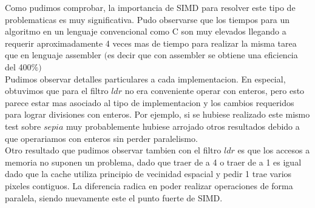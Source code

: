 Como pudimos comprobar, la importancia de SIMD para resolver este tipo de problematicas es muy significativa. 
Pudo observarse que los tiempos para un algoritmo en un lenguaje convencional como C son muy elevados llegando a requerir aproximadamente 4 veces mas de tiempo para realizar la misma tarea que en lenguaje assembler $($es decir que con assembler se obtiene una eficiencia del 400$ \% )$\\

Pudimos observar detalles particulares a cada implementacion. En especial, obtuvimos que para el filtro $ldr$ no era conveniente operar con enteros, pero esto parece estar mas asociado al tipo de implementacion y los cambios requeridos para lograr divisiones con enteros. Por ejemplo, si se hubiese realizado este mismo test sobre $sepia$ muy probablemente hubiese arrojado otros resultados debido a que operariamos con enteros sin perder paralelismo.\\

Otro resultado que pudimos observar tambien con el filtro $ldr$ es que los accesos a memoria no suponen un problema, dado que traer de a 4 o traer de a 1 es igual dado que la cache utiliza principio de vecinidad espacial y pedir 1 trae varios pixeles contiguos. La diferencia radica en poder realizar operaciones de forma paralela, siendo nuevamente este el punto fuerte de SIMD. \\


